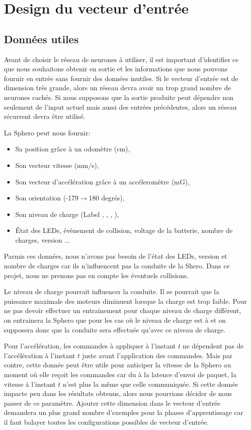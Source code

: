 \section{Design du vecteur d'entrée}
\subsection{Données utiles}
Avant de choisir le réseau de neurones à utiliser, il est important d'identifier ce que nous souhaitons obtenir en sortie et les informations que nous pouvons fournir en entrée sans fournir des données inutiles.
Si le vecteur d'entrée est de dimension très grande, alors un réseau \rbf devra avoir un trop grand nombre de neurones cachés\cite{Gauthier}.
Si nous supposons que la sortie produite peut dépendre non seulement de l'input actuel mais aussi des entrées précédentes, alors un réseau récurrent devra être utilisé.

La Sphero peut nous fournir:\cite{SDKofficiels}
\begin{itemize}
 \item Sa position grâce à un odomètre (cm),
 \item Son vecteur vitesse (mm/s),
 \item Son vecteur d'accélération grâce à un accéleromètre (mG),
 \item Son orientation (-179$\rightarrow$180 degrés),
 \item Son niveau de charge (Label , , , ),
 \item État des LEDs, évènement de collision, voltage de la batterie, nombre de charges, version ...
\end{itemize}

Parmis ces données, nous n'avons pas besoin de l'état des LEDs, version et nombre de charges car ils n'influencent pas la conduite de la Shero.
Dans ce projet, nous ne prenons pas en compte les éventuels collisions.

Le niveau de charge pourrait influencer la conduite.
Il se pourrait que la puissance maximale des moteurs diminuent lorsque la charge est trop faible.
Pour ne pas devoir effectuer un entrainement pour chaque niveau de charge différent, on entrainera la Sphero que pour les cas où le niveau de charge est à  et on supposera donc que la conduite sera effectuée qu'avec ce niveau de charge.

Pour l'accélération, les commandes à appliquer à l'instant $t$ ne dépendent pas de l'accélération à l'instant $t$ juste avant l'application des commandes.
Mais par contre, cette donnée peut être utile pour anticiper la vitesse de la Sphero au moment où elle reçoit les commandes car du à la latence d'envoi de paquet, la vitesse à l'instant $t$ n'est plus la même que celle communiquée.
Si cette donnée impacte peu dans les résultats obtenus, alors nous pourrions décider de nous passer de ce paramètre.
Ajouter cette dimension dans le vecteur d'entrée demandera un plus grand nombre d'exemples pour la phases d'apprentissage car il faut balayer toutes les configurations possibles de vecteur d'entrée.

